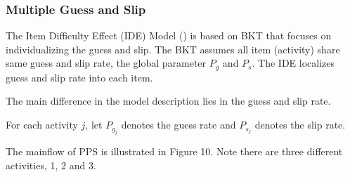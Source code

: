 \documentclass{article}
\begin{document}
\begin{center}
\end{center}


\subsubsection{Multiple Guess and Slip}

The Item Difficulty Effect (IDE) Model (\cite{multiguess}) is based on BKT that focuses on individualizing the guess and slip. The BKT assumes all item (activity) share same guess and slip rate, the global parameter \( P_g \) and \( P_s \). The IDE localizes guess and slip rate into each item.

The main difference in the model description lies in the guess and slip rate.

For each activity \( j \), let \( P_{g_j} \) denotes the guess rate and \( P_{s_j} \) denotes the slip rate.

The mainflow of PPS is illustrated in Figure 10. Note there are three different activities, 1, 2 and 3.
\end{document}
